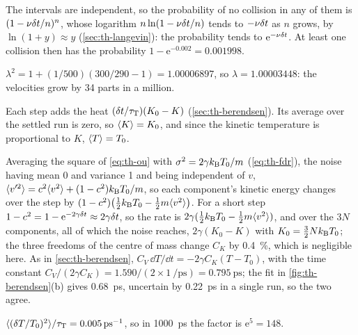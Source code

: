 \label{sec:th-solutions}

The intervals are independent, so the
probability of no collision in any of them is $(1 - \nu\delta t/n)^n$, whose
logarithm $n\ln(1 - \nu\delta t/n)$ tends to $-\nu\delta t$ as $n$ grows, by $\ln(1 +
y) \approx y$ (\cref{sec:th-langevin}): the probability tends to
$\mathrm{e}^{-\nu\delta t}$. At least one collision then has the probability
$1 - \mathrm{e}^{-0.002} = 0.001998$.

$\lambda^2 = 1 + (1/500)(300/290 - 1) =
1.00006897$, so $\lambda = 1.00003448$: the velocities grow by 34 parts in
a million.

Each step adds the heat $(\delta t/\tau_{\mathrm
T})(K_0 - K)$ (\cref{sec:th-berendsen}). Its average over the settled run
is zero, so $\langle K \rangle = K_0$, and since the kinetic temperature is
proportional to $K$, $\langle T \rangle = T_0$.

Averaging the square of \cref{eq:th-ou} with
$\sigma^2 = 2\gamma k_{\mathrm{B}} T_0/m$ (\cref{eq:th-fdr}), the noise having mean 0
and variance 1 and being independent of $v$, $\langle v'^2 \rangle = c^2\langle v^2 \rangle + (1 -
c^2)k_{\mathrm{B}} T_0/m$, so each component's kinetic energy changes over the step
by $(1 - c^2)\bigl(\frac12k_{\mathrm{B}} T_0 - \frac12m\langle v^2 \rangle\bigr)$. For a short
step $1 - c^2 = 1 - \mathrm{e}^{-2\gamma\delta t} \approx 2\gamma\delta t$, so the
rate is $2\gamma(\frac12k_{\mathrm{B}} T_0 - \frac12m\langle v^2 \rangle)$, and over the $3N$
components, all of which the noise reaches, $2\gamma(K_0 - K)$ with $K_0 =
\frac32Nk_{\mathrm{B}} T_0$; the three freedoms of the centre of mass change $C_K$ by
\SI{0.4}{\percent}, which is negligible here. As in
\cref{sec:th-berendsen}, $C_V\,\dd T/\dd t = -2\gamma C_K(T - T_0)$, with
the time constant $C_V/(2\gamma C_K) = 1.590/(2\times\SI{1}{\per\pico
\second}) = \SI{0.795}{\pico\second}$; the fit in
\cref{fig:th-berendsen}(b) gives \SI{0.68}{\pico\second}, uncertain by
\SI{0.22}{\pico\second} in a single run, so the two agree.

$\ens{(\delta T/T_0)^2}/\tau_{\mathrm T} =
\SI{0.005}{\per\pico\second}$, so in \SI{1000}{\pico\second} the factor is
$\mathrm{e}^5 = 148$.

